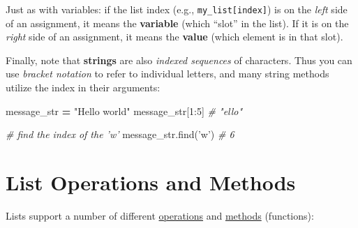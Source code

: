 \documentclass[]{book}
\newenvironment{Shaded}{\begin{snugshade}}{\end{snugshade}}
\newcommand{\DecValTok}[1]{\textcolor[rgb]{0.00,0.00,0.81}{#1}}
\newcommand{\StringTok}[1]{\textcolor[rgb]{0.31,0.60,0.02}{#1}}
\newcommand{\CommentTok}[1]{\textcolor[rgb]{0.56,0.35,0.01}{\textit{#1}}}
\newcommand{\OperatorTok}[1]{\textcolor[rgb]{0.81,0.36,0.00}{\textbf{#1}}}
\newcommand{\NormalTok}[1]{#1}
\begin{document}
Just as with variables: if the list index (e.g.,
\texttt{my\_list{[}index{]}}) is on the \emph{left} side of an
assignment, it means the \textbf{variable} (which ``slot'' in the list).
If it is on the \emph{right} side of an assignment, it means the
\textbf{value} (which element is in that slot).

Finally, note that \textbf{strings} are also \emph{indexed sequences} of
characters. Thus you can use \emph{bracket notation} to refer to
individual letters, and many string methods utilize the index in their
arguments:

\begin{Shaded}
\begin{Highlighting}[]
\NormalTok{message_str }\OperatorTok{=} \StringTok{"Hello world"}
\NormalTok{message_str[}\DecValTok{1}\NormalTok{:}\DecValTok{5}\NormalTok{]  }\CommentTok{# "ello"}

\CommentTok{# find the index of the 'w'}
\NormalTok{message_str.find(}\StringTok{'w'}\NormalTok{)  }\CommentTok{# 6}
\end{Highlighting}
\end{Shaded}

\hypertarget{list-operations-and-methods}{\section{List Operations and
Methods}\label{list-operations-and-methods}}

Lists support a number of different
\href{https://docs.python.org/3/library/stdtypes.html\#common-sequence-operations}{operations}
and
\href{https://docs.python.org/3/tutorial/datastructures.html\#more-on-lists}{methods}
(functions):
\end{document}
